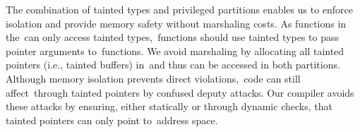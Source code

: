 {The combination of tainted types and privileged partitions enables us to enforce isolation and provide memory safety without marshaling costs.
As functions in the~\ucregion can only access tainted types,~\cregion functions should use tainted types to pass pointer arguments to~\ucregion functions. 
We avoid marshaling by allocating all tainted pointers (i.e., tainted buffers) in~\ucregion and thus can be accessed in both partitions.
Although memory isolation prevents direct violations,~\ucregion code can still affect~\cregion through tainted pointers by confused deputy attacks.
Our compiler avoids these attacks by ensuring, either statically or through dynamic checks, that tainted pointers can only point to~\ucregion address space.

%
%
%
%
}
